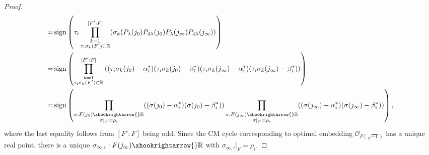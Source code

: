 \documentclass{amsart}
\numberwithin{equation}{subsection}
\numberwithin{theorem}{section}
\theoremstyle{definition}
\theoremstyle{remark}
\newcommand{\bR}{\mathbb{R}}
\newcommand{\cO}{\mathcal{O}}
\DeclareMathOperator{\sgn}{sign}
\begin{document}
\begin{proof}
\begin{align*}
    =&\sgn\left(\tau_i \prod^{[F':F]}_{\substack{k=1\\\tau_i\sigma_k(F')\subset \bR}} (\sigma_k (P_{\lambda}(j_0)P_{4\lambda}(j_0)P_{\lambda}(j_\infty)P_{4\lambda}(j_\infty))\right)\\
   = &\sgn\left(\prod^{[F':F]}_{\substack{k=1\\\tau_i\sigma_k(F')\subset \bR}}\left((\tau_i\sigma_k(j_0) - \alpha_{i}^*)(\tau_i\sigma_k(j_0)- \beta_i^*)(\tau_i\sigma_k(j_\infty) - \alpha_{i}^*)(\tau_i\sigma_k(j_\infty)- \beta_i^*)  \right)\right)\\
   =&\sgn\left(\prod_{\substack{\sigma: F(j_0)\xhookrightarrow{}\bR \\ \sigma|_{F} = \rho_i}}((\sigma(j_0) - \alpha_{i}^*)(\sigma(j_0)- \beta_i^*)) \prod_{\substack{\sigma: F(j_\infty)\xhookrightarrow{}\bR \\ \sigma|_{F} = \rho_i}}((\sigma(j_\infty) - \alpha_{i}^*)(\sigma(j_\infty)- \beta_i^*))\right),
\end{align*} where the last equality follows from $[F':F]$ being odd. 
Since the CM cycle corresponding to optimal embedding $\cO_{F(\sqrt{-1})}$ has a unique real point, there is a unique $\sigma_{\infty,i}: F(j_{\infty}) \xhookrightarrow{} \bR$ with $\sigma_{\infty,i}|_F = \rho_i$.
\end{proof} 
\end{document}
